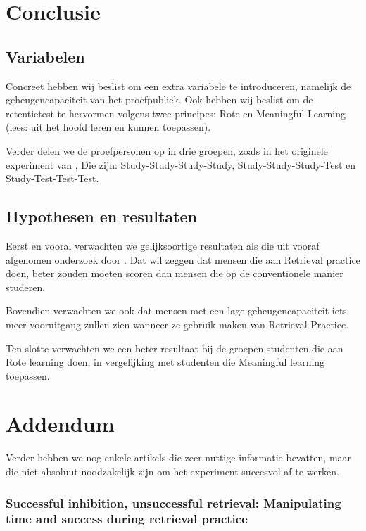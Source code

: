 \documentclass{hogent-article}
\begin{document}
\section{Conclusie}

\subsection{Variabelen}
Concreet hebben wij beslist om een extra variabele te introduceren, namelijk de geheugencapaciteit van het proefpubliek. Ook hebben wij beslist om de retentietest te hervormen volgens twee principes: Rote en Meaningful Learning (lees: uit het hoofd leren en kunnen toepassen).\\
\par
\noindent    
Verder delen we de proefpersonen op in drie groepen, zoals in het originele experiment van \cite{Henry2006} , Die zijn: Study-Study-Study-Study, Study-Study-Study-Test  en Study-Test-Test-Test. 

\subsection{Hypothesen en resultaten}

\noindent
Eerst en vooral verwachten we gelijksoortige resultaten als die uit vooraf afgenomen onderzoek door \cite{Henry2006}. Dat wil zeggen dat mensen die aan Retrieval practice doen, beter zouden moeten scoren dan mensen die op de conventionele manier studeren.\\
\par
\noindent
Bovendien verwachten we ook dat mensen met een lage geheugencapaciteit iets meer vooruitgang zullen zien wanneer ze gebruik maken van Retrieval Practice.\\
\par
\noindent
Ten slotte verwachten we een beter resultaat bij de groepen studenten die aan Rote learning doen, in vergelijking met studenten die Meaningful learning toepassen.


\section{Addendum}

Verder hebben we nog enkele artikels die zeer nuttige informatie bevatten, maar die niet absoluut noodzakelijk zijn om het experiment succesvol af te werken.

\subsubsection{Successful inhibition, unsuccessful retrieval: Manipulating time and success during retrieval practice}
\end{document}
